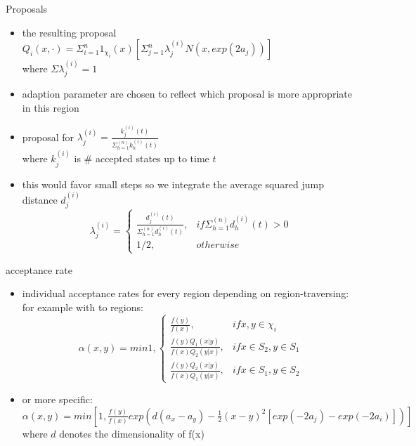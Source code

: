 \begin{frame}
\begin{block}{Proposals}
\begin{itemize}
\item the resulting proposal\\

$Q_i(x,\cdot) = \Sigma_{i=1}^n 1_{\chi_i}(x)[\Sigma_{j=1}^n\lambda_j^{(i)}N(x, exp(2a_j))] $\\
where $\Sigma \lambda_j^{(i)} = 1 $
\item adaption parameter are chosen to reflect which proposal is more appropriate in this region

\item proposal for $\lambda_j^{(i)} = \frac{k_j^{(i)}(t)}{\Sigma_{h=1}^{(n)}k_h^{(i)}(t)}$\\ 
where $k_j^{(i)}$ is \# accepted states up to time $t$
\item this would favor small steps so we integrate the average squared jump distance $d_j^{(i)}$
\[
   \lambda_j^{(i)}= 
\begin{cases}
    \frac{d_j^{(i)}(t)}{\Sigma_{h=1}^{(n)}d_h^{(i)}(t)},& if \Sigma_{h=1}^{(n)}d_h^{(i)}(t) > 0\\
    1/2,              & otherwise
\end{cases}
\]

\end{itemize}
\end{block}

\end{frame}

\begin{frame}
\begin{block}{acceptance rate}
\begin{itemize}
\item individual acceptance rates for every region depending on region-traversing:
for example with to regions:
\[
   \alpha(x,y)=min 1, 
\begin{cases}
    \frac{f(y)}{f(x)},& if x,y \in \chi_i\\
    \frac{f(y)Q_1(x|y)}{f(x)Q_2(y|x)},  & if x \in S_2,y \in S_1\\
    \frac{f(y)Q_2(x|y)}{f(x)Q_1(y|x)},  & if x \in S_1,y \in S_2
\end{cases}
\]
\item or more specific:\\
$\alpha(x,y)  = min[1,\frac{f(y)}{f(x)} exp(d(a_x-a_y)-\frac{1}{2}(x-y)^2[exp(-2a_j)-exp(-2a_i)])]$
where $d$ denotes the dimensionality of f(x)


\end{itemize}
\end{block}

\end{frame}

